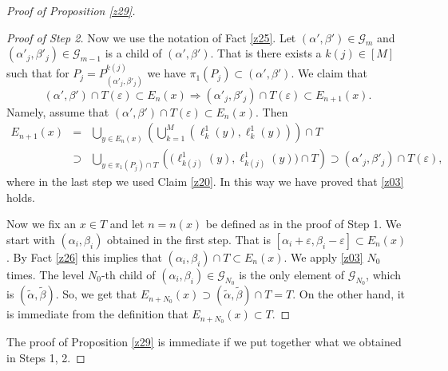 \documentclass[amssymb,amsfonts,12pt,verbatim,righttag,oneside]{amsart}
\numberwithin{equation}{section} %
\theoremstyle{plain}
\theoremstyle{plain}
\begin{document}
\begin{proof}[Proof of Proposition \ref{z29}]
\begin{proof}[Proof of Step 2]
  Now we use the notation of Fact \ref{z25}. Let $(\alpha ',\beta ')\in \mathcal{G}_m$ and $(\alpha'_j,\beta'_j)\in \mathcal{G}_{m-1}$ is a child of $(\alpha ',\beta ')$. That is there exists a $k(j)\in[M]$ such that for
  $P_j=P _{(\alpha'_j,\beta'_j) }^{k(j) }$ we have
  $\pi _1(P_j)\subset (\alpha ',\beta ')$. We claim that
\begin{equation}
\label{z03}
(\alpha ',\beta ')\cap T(\varepsilon )\subset E_n(x)
\Longrightarrow
(\alpha '_j,\beta '_j)\cap T(\varepsilon )\subset E_{n+1}(x).
\end{equation}
Namely, assume that $(\alpha ',\beta ')\cap T(\varepsilon )\subset E_n(x)$. Then
\begin{eqnarray}
  E_{n+1}(x) &=& \bigcup\limits_{y\in E_{n}(x)}
  \left(
    \bigcup\limits_{k=1}^{M}
    \left(
      \ell  _{k}^{1}(y),\ell  _{k}^{1}(y)
     \right)
   \right)\cap T
  \\
   &\supset&
   \bigcup\limits_{y\in \pi _1(P_j)\cap T}
   \left(\big(
      \ell  _{k(j)}^{1}(y),\ell  _{k(j)}^{1}(y)\big)\cap T
     \right)
     \supset
     (\alpha '_j,\beta '_j)\cap T(\varepsilon ),
  \end{eqnarray}
where in the last step we used Claim \ref{z20}.
In this way we have proved that \eqref{z03} holds.

Now we fix an $x\in T$ and let $n=n(x)$ be defined as in the proof of Step 1.
We start with $(\alpha _i,\beta _i)$  obtained in the first step.
That is $[\alpha_i+\varepsilon,\beta_i-\varepsilon] \subset E_n(x)$. By Fact \ref{z26} this implies that $(\alpha_i,\beta_i)\cap T \subset E_n(x)$.
We apply \eqref{z03} $N_0$ times. The level $N_0$-th child of $(\alpha _i,\beta _i)\in\mathcal{G}_{N_0}$ is the only element of $\mathcal{G}_{N_0}$,
which is $(\widetilde{\alpha} ,\widetilde{\beta })$. So, we get that
$E_{n+N_0}(x)\supset
(\widetilde{\alpha} ,\widetilde{\beta })\cap T=T$. On the other hand, it is immediate from the definition that $E_{n+N_0}(x) \subset T$.
  \end{proof}
The proof of Proposition \ref{z29} is immediate if we put together what we obtained in Steps 1, 2.
\end{proof}
\end{document}

